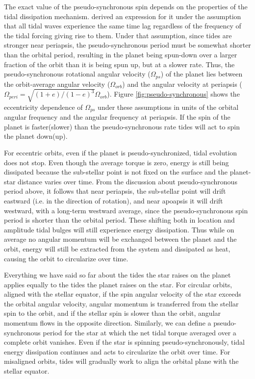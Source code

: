 The exact value of the pseudo-synchronous spin depends on the properties of the
tidal dissipation mechanism. \citet{Hut_81} derived an expression for it under
the assumption that all tidal waves experience the same time lag regardless of
the frequency of the tidal forcing giving rise to them. Under that assumption,
since tides are stronger near periapsis, the pseudo-synchronous period must be
somewhat shorter than the orbital period, resulting in the planet being
spun-down over a larger fraction of the orbit than it is being spun up, but at a
slower rate. Thus, the \citet{Hut_81} pseudo-synchronous rotational angular
velocity ($\Omega_{ps}$) of the planet lies between the orbit-average angular
velocity ($\Omega_{orb}$) and the angular velocity at periapsis ($\Omega_{peri}
= \sqrt{(1+e)/(1-e)^3}\Omega_{orb}$). Figure \ref{fig:pseudo-synchronous} shows
the eccentricity dependence of $\Omega_{ps}$ under these assumptions in units of
the orbital angular frequency and the angular frequency at periapsis. If the
spin of the planet is faster(slower) than the pseudo-synchronous rate tides will
act to spin the planet down(up).

For eccentric orbits, even if the planet is pseudo-synchronized, tidal evolution
does not stop. Even though the average torque is zero, energy is still being
dissipated because the sub-stellar point is not fixed on the surface and the
planet-star distance varies over time. From the discussion about
pseudo-synchronous period above, it follows that near periapsis, the sub-stellar
point will drift eastward (i.e. in the direction of rotation), and near apoapsis
it will drift westward, with a long-term westward average, since the
pseudo-synchronous spin period is shorter than the orbital period. These
shifting both in location and amplitude tidal bulges will still experience
energy dissipation. Thus while on average no angular momentum will be exchanged
between the planet and the orbit, energy will still be extracted from the system
and dissipated as heat, causing the orbit to circularize over time.

Everything we have said so far about the tides the star raises on the planet
applies equally to the tides the planet raises on the star. For circular orbits,
aligned with the stellar equator, if the spin angular velocity of the star
exceeds the orbital angular velocity, angular momentum is transferred from the
stellar spin to the orbit, and if the stellar spin is slower than the orbit,
angular momentum flows in the opposite direction. Similarly, we can define a
pseudo-synchronous period for the star at which the net tidal torque averaged
over a complete orbit vanishes. Even if the star is spinning
pseudo-synchronously, tidal energy dissipation continues and acts to circularize
the orbit over time. For misaligned orbits, tides will gradually work to align
the orbital plane with the stellar equator.

